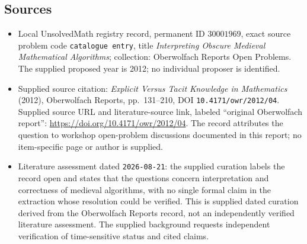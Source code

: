 \documentclass[11pt]{article}
\begin{document}
\subsection{Sources}
\begin{itemize}
\item Local UnsolvedMath registry record, permanent ID \(30001969\), exact source problem code \texttt{catalogue entry}, title \emph{Interpreting Obscure Medieval Mathematical Algorithms}; collection: Oberwolfach Reports Open Problems. The supplied proposed year is 2012; no individual proposer is identified.
\item Supplied source citation: \emph{Explicit Versus Tacit Knowledge in Mathematics} (2012), Oberwolfach Reports, pp.\ 131--210, DOI \texttt{10.4171/owr/2012/04}. Supplied source URL and literature-source link, labeled ``original Oberwolfach report'': \url{https://doi.org/10.4171/owr/2012/04}. The record attributes the question to workshop open-problem discussions documented in this report; no item-specific page or author is supplied.
\item Literature assessment dated \texttt{2026-08-21}: the supplied curation labels the record open and states that the questions concern interpretation and correctness of medieval algorithms, with no single formal claim in the extraction whose resolution could be verified. This is supplied dated curation derived from the Oberwolfach Reports record, not an independently verified literature assessment. The supplied background requests independent verification of time-sensitive status and cited claims.
\end{itemize}
\end{document}
